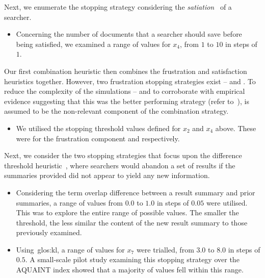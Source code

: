 Next, we enumerate the stopping strategy considering the \emph{satiation}~\citep{simon1955satiation} of a searcher.

\begin{itemize}
    \item{ Concerning the number of documents that a searcher should save before being satisfied, we examined a range of values for $x_4$, from $1$ to $10$ in steps of $1$.}
\end{itemize}

Our first combination heuristic then combines the frustration and satisfaction heuristics together. However, two frustration stopping strategies exist --  and . To reduce the complexity of the simulations -- and to corroborate with empirical evidence suggesting that this was the better performing strategy (refer to~\cite{maxwell2015stopping_strategies}),  is assumed to be the non-relevant component of the combination strategy.

\begin{itemize}
    \item{ We utilised the stopping threshold values defined for $x_2$ and $x_4$ above. These were for the frustration component  and  respectively.}
\end{itemize}

Next, we consider the two stopping strategies that focus upon the difference threshold heuristic~\citep{nickles1995judgment}, where searchers would abandon a set of results if the summaries provided did not appear to yield any new information.

\begin{itemize}
    \item{ Considering the term overlap difference between a result summary and prior summaries, a range of values from $0.0$ to $1.0$ in steps of $0.05$ were utilised. This was to explore the entire range of possible values. The smaller the threshold, the less similar the content of the new result summary to those previously examined.}
    
    \item{ Using~\gls{glos:kl}, a range of values for $x_7$ were trialled, from $3.0$ to $8.0$ in steps of $0.5$. A small-scale pilot study examining this stopping strategy over the AQUAINT index showed that a majority of values fell within this range.}
\end{itemize}

